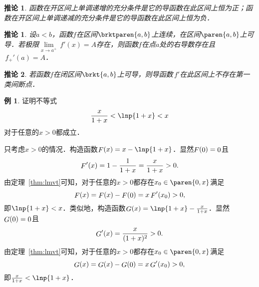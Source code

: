 \documentclass[a4paper,punct=CCT]{ctexbook}
\makeatletter
\newtheorem{corollary}[theorem]{推论}
\newtheorem*{corollary*}{推论}
\theoremstyle{definition}
\newtheorem*{example*}{例}
\theoremstyle{remark}
\renewcommand*{\proofname}{证}
\renewenvironment{proof}[1][\proofname]{\par
  \pushQED{\qed}%
  \normalfont \topsep6\p@\@plus6\p@\relax
  \trivlist
  \item[\hskip\labelsep
    \bfseries
    #1%
    ]\ignorespaces
}{%
  \popQED\endtrivlist\@endpefalse
}
\makeatother
\begin{document}
\begin{corollary}
  \label{cor:lmvtmono}
  函数在开区间上单调递增的充分条件是它的导函数在此区间上恒为正；函数在开区间上单调递减的充分条件是它的导函数在此区间上恒为负．
\end{corollary}

\begin{corollary*}
  设\(a < b\)，函数\(f\)在区间\(\brktparen{a,b}\)上连续，在区间\(\paren{a,b}\)上可导．若极限\(\!\lim\limits_{x\to a^+} \,f'(x) = A\)存在，则函数\(f\)在点\(a\)处的右导数存在且\(\,f_+'(a) = A\)．
\end{corollary*}

\begin{corollary*}
  若函数\(f\)在闭区间\(\brkt{a,b}\)上可导，则导函数\(\,f'\!\)在此区间上不存在第一类间断点．
\end{corollary*}

\begin{example*}
  证明不等式
  \begin{equation*}
    \frac{x}{1+x} < \lnp{1+x} < x
  \end{equation*}
  对于任意的\(x > 0\)都成立．

  \begin{proof}
    只考虑\(x > 0\)的情况．构造函数\(\Fn F(x) = x - \lnp{1+x}\)．显然\(\mathop{\relax F}\nolimits(\mathop{\relax 0}\nolimits) = \mathop{\relax 0}\nolimits\)且
    \begin{equation*}
      \mathop{\relax F}\nolimits'(x) = 1 - \frac{1}{1+x} = \frac{x}{1+x} > 0.
    \end{equation*}
    由定理~\ref{thm:lmvt}可知，对于任意的\(x > 0\)都存在\(x_0 \in \paren{0,x}\)满足
    \begin{equation*}
      \mathop{\relax F}\nolimits(x) = \mathop{\relax F}\nolimits(x) - \mathop{\relax F}\nolimits(\mathop{\relax 0}\nolimits) = x \mathop{\relax F}\nolimits'(x_0) > 0,
    \end{equation*}
    即\(\lnp{1+x} < x\)．类似地，构造函数\(\Fn G(x) = \lnp{1+x} - \frac{x}{1+x}\)．显然\(\mathop{\relax G}\nolimits(\mathop{\relax 0}\nolimits) = \mathop{\relax 0}\nolimits\)且
    \begin{equation*}
      \mathop{\relax G}\nolimits'(x) = \frac{x}{(1+x)^2} > 0.
    \end{equation*}
    由定理~\ref{thm:lmvt}可知，对于任意的\(x > 0\)都存在\(x_0 \in \paren{0,x}\)满足
    \begin{equation*}
      \mathop{\relax G}\nolimits(x) = \mathop{\relax G}\nolimits(x) - \mathop{\relax G}\nolimits(\mathop{\relax 0}\nolimits) = x \mathop{\relax G}\nolimits'(x_0) > 0,
    \end{equation*}
    即\(\frac{x}{1+x} < \lnp{1+x}\)．
  \end{proof}
\end{example*}
\end{document}
